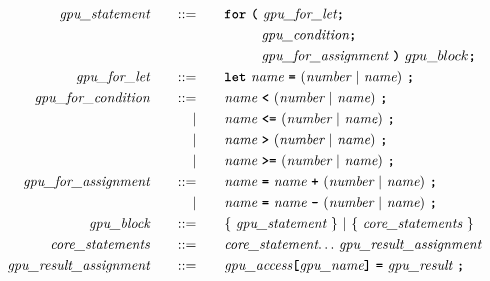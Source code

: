 \begin{alignat*}{9}
    && \textit{gpu\_statement} 
    &&\quad ::= &\quad 
    && \textbf{\texttt{for}}\ \textbf{\texttt{(}} 
                              \ \textit{gpu\_for\_let} \textbf{\texttt{;}} \\
    &&  &&     &\quad && \ \ \ \ \ \ \ \  \textit{gpu\_condition} \textbf{\texttt{;}} \\
    &&  &&     &\quad && \ \ \ \ \ \ \ \  \textit{gpu\_for\_assignment} \ \textbf{\texttt{)}}  \ gpu\_block \textbf{\texttt{;}} \\
    && \textit{gpu\_for\_let} 
    &&\quad ::= &\quad 
    && \textbf{\texttt{let}}\  \textit{name} \ 
                                               \textbf{\texttt{=}}\  (\textit{number} \ | \ \textit{name}) \ \textbf{\texttt{;}} \\
    && \textit{gpu\_for\_condition} 
    &&\quad ::= &\quad 
    && \textit{name} \ 
    \textbf{\texttt{<}}\  (\textit{number} \ | \ \textit{name})\ \textbf{\texttt{;}} \\
    &&  && |    &\quad && \textit{name} \ \textbf{\texttt{<=}}\  (\textit{number} \ | \ \textit{name})\ \textbf{\texttt{;}} \\
    &&  && |    &\quad && \textit{name} \ \textbf{\texttt{>}}\  (\textit{number} \ | \ \textit{name})\ \textbf{\texttt{;}} \\
    &&  && |    &\quad && \textit{name} \ \textbf{\texttt{>=}}\  (\textit{number} \ | \ \textit{name})\ \textbf{\texttt{;}} \\
    && \textit{gpu\_for\_assignment} 
    &&\quad ::= &\quad 
    && \textit{name} \ \textbf{\texttt{=}}\  \textit{name} \  \textbf{\texttt{+}} \ (\textit{number} \ | \ \textit{name}) \  \textbf{\texttt{;}} \\
    && && |    &\quad && \textit{name} \ \textbf{\texttt{=}}\  \textit{name} \  \textbf{\texttt{-}} \ (\textit{number} \ | \ \textit{name}) \  \textbf{\texttt{;}} \\
    && \textit{gpu\_block} 
    &&\quad ::= &\quad 
    && \{ \ \textit{gpu\_statement} \ \} \ | \ \{ \ \textit{core\_statements} \ \} \\
    && \textit{core\_statements} 
    &&\quad ::= &\quad 
    && \textit{core\_statement} {\ldots} \ \textit{gpu\_result\_assignment} \\
    && \textit{gpu\_result\_assignment} 
    &&\quad ::= &\quad 
    && \textit{gpu\_access} \textbf{\texttt{[}} \textit{gpu\_name} \textbf{\texttt{]}}\ \textbf{\texttt{=}}\  \textit{gpu\_result} \ \textbf{\texttt{;}} \\

\end{alignat*}

